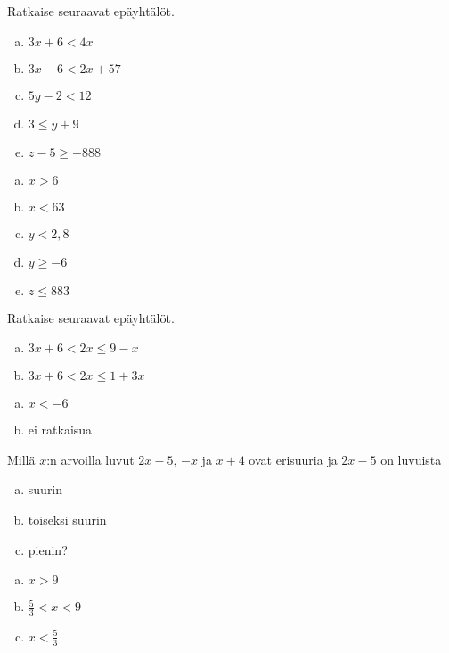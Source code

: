 \begin{tehtava}
    Ratkaise seuraavat epäyhtälöt.
    \begin{enumerate}[a)]
        \item $3x+6<4x$
        \item $3x-6<2x+57$
        \item $5y-2<12$
        \item $3\leq y+9$
        \item $z-5\geq-888$
    \end{enumerate}
    \begin{vastaus}
        \begin{enumerate}[a)]
            \item $x>6$
            \item $x<63$
            \item $y<2,8$
            \item $y\geq -6$
            \item $z\leq 883$
        \end{enumerate}
    \end{vastaus}
\end{tehtava}

\begin{tehtava}
    Ratkaise seuraavat epäyhtälöt.
    \begin{enumerate}[a)]
        \item $3x+6<2x\leq 9-x$
        \item $3x+6<2x\leq 1+3x$
    \end{enumerate}
    \begin{vastaus}
        \begin{enumerate}[a)]
            \item $x<-6$
            \item ei ratkaisua
        \end{enumerate}
    \end{vastaus}
\end{tehtava}


\begin{tehtava}
	Millä $x$:n arvoilla luvut $2x - 5$, $-x$ ja $x + 4$ ovat erisuuria ja $2x - 5$ on luvuista
	\begin{enumerate}[a)]
		\item suurin
		\item toiseksi suurin
		\item pienin?
	\end{enumerate}
	\begin{vastaus}
		\begin{enumerate}[a)]
			\item $x > 9$
			\item $\frac{5}{3} < x < 9$
			\item $x < \frac{5}{3}$
		\end{enumerate}
	\end{vastaus}
\end{tehtava}

